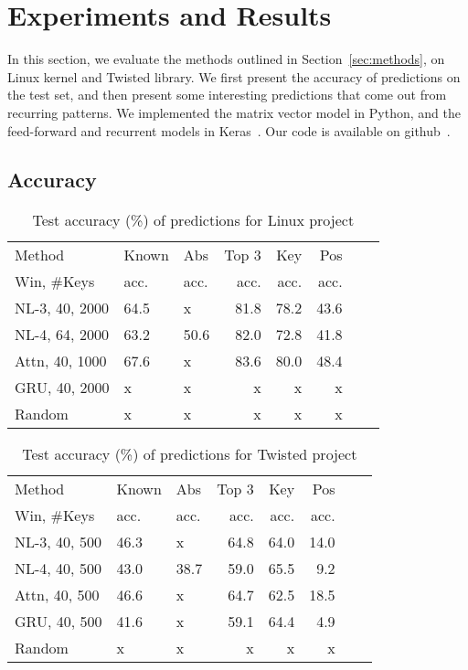 \section{Experiments and Results}
\label{sec:results}

In this section, we evaluate the methods outlined in Section~\ref{sec:methods},
on Linux kernel and Twisted library. We first present the accuracy of
predictions on the test set, and then present some interesting predictions that
come out from recurring patterns. We implemented the matrix vector model in
Python, and the feed-forward and recurrent models in Keras~\cite{ref:keras}.
Our code is available on github~\cite{ref:codecompletion}.

\subsection{Accuracy}
\label{sec:accuracy}

\begin{table}[h]
  \centering
  \small {
  \begin{tabular}{l l l r r r r r}
    \hline
    Method & Known & Abs & Top 3 & Key & Pos \\
    Win, \#Keys & acc. & acc. & acc.  & acc. & acc. \\
    \hline
    NL-3, 40, 2000 & 64.5 & x & 81.8 & 78.2 & 43.6\\
    NL-4, 64, 2000 & 63.2 & 50.6 & 82.0 & 72.8 & 41.8\\
    Attn, 40, 1000 & 67.6 & x & 83.6 & 80.0 & 48.4\\
    GRU, 40, 2000 & x & x & x & x & x\\
    Random & x & x & x & x & x\\
    \hline
  \end{tabular}
  }
  \caption{Test accuracy (\%) of predictions for Linux project}
  \label{tab:linux}
\end{table}

\begin{table}[h]
  \centering
  \small {
  \begin{tabular}{l l l r r r r r}
    \hline
    Method & Known & Abs & Top 3 & Key & Pos \\
    Win, \#Keys & acc. & acc. & acc.  & acc. & acc. \\
    \hline
    NL-3, 40, 500 & 46.3 & x & 64.8 & 64.0 & 14.0\\
    NL-4, 40, 500 & 43.0 & 38.7 & 59.0 & 65.5 & 9.2\\
    Attn, 40, 500 & 46.6 & x & 64.7 & 62.5 & 18.5\\
    GRU, 40, 500 & 41.6 & x & 59.1 & 64.4 & 4.9\\
    Random & x & x & x & x & x\\
    \hline
  \end{tabular}
  }
  \caption{Test accuracy (\%) of predictions for Twisted project}
  \label{tab:twisted}
\end{table}

